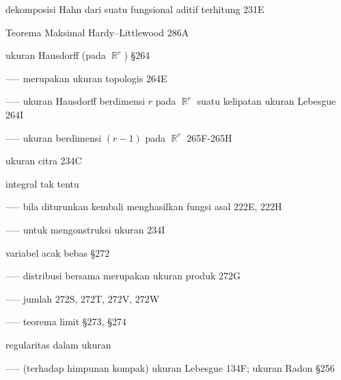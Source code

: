  dekomposisi Hahn dari suatu fungsional aditif terhitung 231E





 Teorema Maksimal Hardy--Littlewood 286A








 ukuran Hausdorff (pada $\BbbR^r$) \S264

----- merupakan ukuran topologis 264E

----- ukuran Hausdorff berdimensi $r$ pada $\BbbR^r$ suatu kelipatan ukuran Lebesgue 264I












----- ukuran berdimensi $(r-1)$ pada $\BbbR^r$ 265F-265H








\indexmedskip

 ukuran citra 234C





 integral tak tentu

----- bila diturunkan kembali menghasilkan fungsi asal 222E, 222H


----- untuk mengonstruksi ukuran 234I



 variabel acak bebas \S272

----- distribusi bersama merupakan ukuran produk 272G


----- jumlah 272S, 272T, 272V, 272W

----- teorema limit \S273, \S274










regularitas dalam ukuran



----- (terhadap himpunan kompak) ukuran Lebesgue 134F; ukuran Radon \S256

















